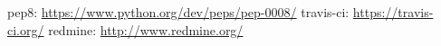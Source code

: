 \noindent
pep8: \url{https://www.python.org/dev/peps/pep-0008/} \newline
travis-ci: \url{https://travis-ci.org/} \newline
redmine: \url{http://www.redmine.org/} \newline